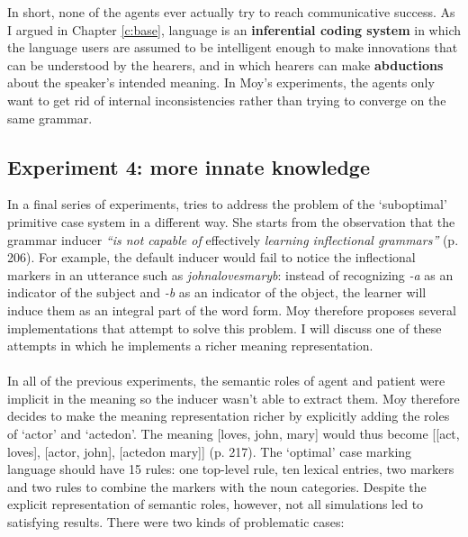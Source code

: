 In short, none of the agents ever actually try to reach communicative success. As I argued in Chapter \ref{c:base}, language is an {\bfseries inferential coding system} in which the language users are assumed to be intelligent enough to make innovations that can be understood by the hearers, and in which hearers can make {\bfseries abductions} about the speaker's intended meaning. In Moy's experiments, the agents only want to get rid of internal inconsistencies rather than trying to converge on the same grammar.

\subsection{Experiment 4: more innate knowledge}

In a final series of experiments, \citet[chapter 7]{moy06case} tries to address the problem of the `suboptimal' primitive case system in a different way. She starts from the observation that the grammar inducer {\em ``is not capable of} effectively {\em learning inflectional grammars''} (p. 206). For example, the default inducer would fail to notice the inflectional markers in an utterance such as {\em johnalovesmaryb}: instead of recognizing {\em -a} as an indicator of the subject and {\em -b} as an indicator of the object, the learner will induce them as an integral part of the word form. Moy therefore proposes several implementations that attempt to solve this problem. I will discuss one of these attempts in which he implements a richer meaning representation.
\\
\\
 In all of the previous experiments, the semantic roles of agent and patient were implicit in the meaning so the inducer wasn't able to extract them. Moy therefore decides to make the meaning representation richer by explicitly adding the roles of `actor' and `actedon'. The meaning [loves, john, mary] would thus become [[act, loves], [actor, john], [actedon mary]] (p. 217). The `optimal' case marking language should have 15 rules: one top-level rule, ten lexical entries, two markers and two rules to combine the markers with the noun categories. Despite the explicit representation of semantic roles, however, not all simulations led to satisfying results. There were two kinds of problematic cases:

